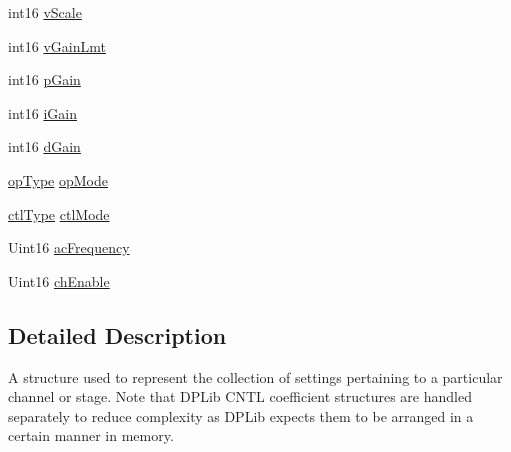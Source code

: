 \begin{DoxyCompactItemize}
\item 
int16 \hyperlink{structchannel_parameters_a7bdcae99eedfaaa8bfda6088cec1c08d}{v\-Scale}
\item 
int16 \hyperlink{structchannel_parameters_a7dd5ddd959b3f3344721e729e51f0db5}{v\-Gain\-Lmt}
\item 
int16 \hyperlink{structchannel_parameters_a2d6c1295ab4c4182bf3f713c283aa37e}{p\-Gain}
\item 
int16 \hyperlink{structchannel_parameters_aafa118e723af6d1ec3cb8dd28fd5e4ef}{i\-Gain}
\item 
int16 \hyperlink{structchannel_parameters_a3fe483bd1d92d76223cbc97d9f32a3de}{d\-Gain}
\item 
\hyperlink{_macro_nets_8h_acd90d47e6937efc4183ab0d18f787575}{op\-Type} \hyperlink{structchannel_parameters_a25d490fa4d7487c8e2e21c1400a6b99b}{op\-Mode}
\item 
\hyperlink{_macro_nets_8h_a5cd368998e9721e657fd7bc6d413807a}{ctl\-Type} \hyperlink{structchannel_parameters_ab31dab8e873272dd15641943b20e56a5}{ctl\-Mode}
\item 
Uint16 \hyperlink{structchannel_parameters_a817bac18060f842dca3867eeb7e2d06c}{ac\-Frequency}
\item 
Uint16 \hyperlink{structchannel_parameters_af99576e00746544eab1d4e88d12f39b4}{ch\-Enable}
\end{DoxyCompactItemize}


\subsection{Detailed Description}
A structure used to represent the collection of settings pertaining to a particular channel or stage. Note that D\-P\-Lib C\-N\-T\-L coefficient structures are handled separately to reduce complexity as D\-P\-Lib expects them to be arranged in a certain manner in memory. 

